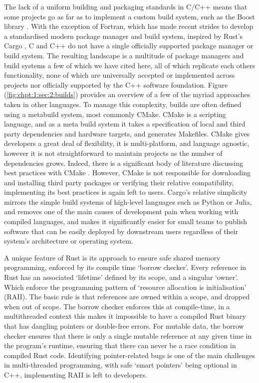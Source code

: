 The lack of a uniform building and packaging standards in C/C++ means that some projects go as far as to implement a custom build system, such as the Boost library \cite{boostbuild2022github}. With the exception of Fortran, which has made recent strides to develop a standardised modern package manager and build system, inspired by Rust's Cargo \cite{fpm2022github}, C and C++ do not have a single officially supported package manager or build system. The resulting landscape is a multitude of package managers \cite{spack2022github, vcpkg2022github, conan2022github} and build systems \cite{meson2022github, bazel2022github, scons2022github} a few of which we have cited here, all of which replicate each others functionality, none of which are universally accepted or implemented across projects nor officially supported by the C++ software foundation. Figure (\ref{fig:chpt:1:sec:2:builds}) provides an overview of a few of the myriad approaches taken in other languages. To manage this complexity, builds are often defined using a metabuild system, most commonly CMake. CMake is a scripting language, and as a meta build system it takes a specification of local and third party dependencies and hardware targets, and generates Makefiles. CMake gives developers a great deal of flexibility, it is multi-platform, and language agnostic, however it is not straightforward to maintain projects as the number of dependencies grows. Indeed, there is a significant body of literature discussing best practices with CMake \cite{scott2018professional}. However, CMake is not responsible for downloading and installing third party packages or verifying their relative compatibility, implementing its best practices is again left to users. Cargo's relative simplicity mirrors the simple build systems of high-level languages such as Python or Julia, and removes one of the main causes of development pain when working with compiled languages, and makes it significantly easier for small teams to publish software that can be easily deployed by downstream users regardless of their system's architecture or operating system.

A unique feature of Rust is its approach to ensure safe shared memory programming, enforced by its compile time `borrow checker'. Every reference in Rust has an associated `lifetime' defined by its scope, and a singular `owner'. Which enforce the programming pattern of `resource allocation is initialisation' (RAII). The basic rule is that references are owned within a scope, and dropped when out of scope. The borrow checker enforces this at compile-time, in a multithreaded context this makes it impossible to have a compiled Rust binary that has dangling pointers or double-free errors. For mutable data, the borrow checker ensures that there is only a single mutable reference at any given time in the program's runtime, ensuring that there can never be a race condition in compiled Rust code. Identifying pointer-related bugs is one of the main challenges in multi-threaded programming, with safe `smart pointers' being optional in C++, implementing RAII is left to developers.

